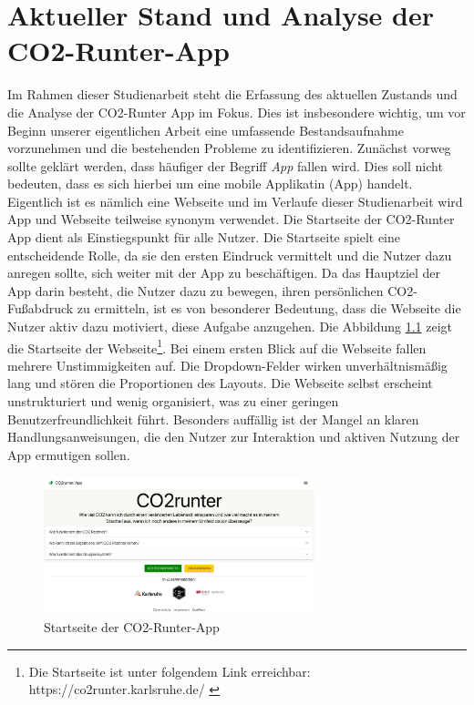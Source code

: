 
\chapter{Aktueller Stand und Analyse der CO2-Runter-App}
\label{chapter:2}

Im Rahmen dieser Studienarbeit steht die Erfassung des aktuellen Zustands und die Analyse der CO2-Runter App im Fokus. Dies ist insbesondere wichtig, um vor Beginn unserer eigentlichen Arbeit eine umfassende Bestandsaufnahme vorzunehmen und die bestehenden Probleme zu identifizieren. Zunächst vorweg sollte geklärt werden, dass häufiger der Begriff \textit{App} fallen wird. Dies soll nicht bedeuten, dass es sich hierbei um eine mobile Applikatin (App) handelt. Eigentlich ist es nämlich eine Webseite und im Verlaufe dieser Studienarbeit wird App und Webseite teilweise synonym verwendet. Die Startseite der CO2-Runter App dient als Einstiegspunkt für alle Nutzer. Die Startseite spielt eine entscheidende Rolle, da sie den ersten Eindruck vermittelt und die Nutzer dazu anregen sollte, sich weiter mit der App zu beschäftigen. Da das Hauptziel der App darin besteht, die Nutzer dazu zu bewegen, ihren persönlichen CO2-Fußabdruck zu ermitteln, ist es von besonderer Bedeutung, dass die Webseite die Nutzer aktiv dazu motiviert, diese Aufgabe anzugehen. Die Abbildung \ref{fig:co2runterapp-landingpage} zeigt die Startseite der Webseite\footnote{Die Startseite ist unter folgendem Link erreichbar: https://co2runter.karlsruhe.de/ \cite{co2runterapp}}. Bei einem ersten Blick auf die Webseite fallen mehrere Unstimmigkeiten auf. Die Dropdown-Felder wirken unverhältnismäßig lang und stören die Proportionen des Layouts. Die Webseite selbst erscheint unstrukturiert und wenig organisiert, was zu einer geringen Benutzerfreundlichkeit führt. Besonders auffällig ist der Mangel an klaren Handlungsanweisungen, die den Nutzer zur Interaktion und aktiven Nutzung der App ermutigen sollen.

\begin{figure}[h]
    \centering
    \includegraphics[width=0.7\textwidth]{images/02/CO2-Runter-App-Landingpage.jpeg}
    \caption{Startseite der CO2-Runter-App}
    \label{fig:co2runterapp-landingpage}
\end{figure}


